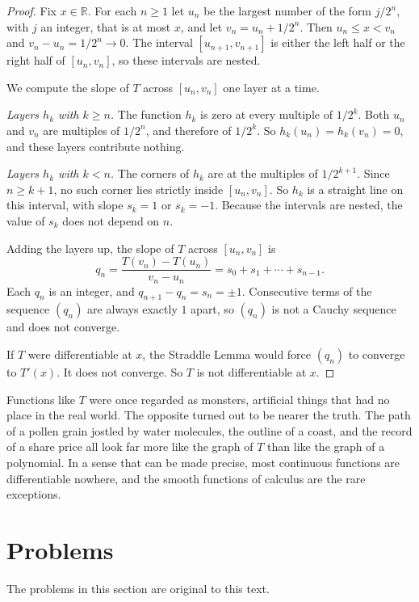 \begin{proof}
Fix $x \in \mathbb{R}$.  For each $n \geq 1$ let $u_n$ be the largest number of the form $j/2^n$, with $j$ an integer, that is at most $x$, and let $v_n = u_n + 1/2^n$.  Then $u_n \leq x < v_n$ and $v_n - u_n = 1/2^n \to 0$.  The interval $[u_{n+1}, v_{n+1}]$ is either the left half or the right half of $[u_n, v_n]$, so these intervals are nested.

We compute the slope of $T$ across $[u_n, v_n]$ one layer at a time.

\emph{Layers $h_k$ with $k \geq n$.}  The function $h_k$ is zero at every multiple of $1/2^k$.  Both $u_n$ and $v_n$ are multiples of $1/2^n$, and therefore of $1/2^k$.  So $h_k(u_n) = h_k(v_n) = 0$, and these layers contribute nothing.

\emph{Layers $h_k$ with $k < n$.}  The corners of $h_k$ are at the multiples of $1/2^{k+1}$.  Since $n \geq k + 1$, no such corner lies strictly inside $[u_n, v_n]$.  So $h_k$ is a straight line on this interval, with slope $s_k = 1$ or $s_k = -1$.  Because the intervals are nested, the value of $s_k$ does not depend on $n$.

Adding the layers up, the slope of $T$ across $[u_n, v_n]$ is
\[ q_n = \frac{T(v_n) - T(u_n)}{v_n - u_n} = s_0 + s_1 + \cdots + s_{n-1}. \]
Each $q_n$ is an integer, and $q_{n+1} - q_n = s_n = \pm 1$.  Consecutive terms of the sequence $(q_n)$ are always exactly $1$ apart, so $(q_n)$ is not a Cauchy sequence and does not converge.

If $T$ were differentiable at $x$, the Straddle Lemma would force $(q_n)$ to converge to $T'(x)$.  It does not converge.  So $T$ is not differentiable at $x$.
\end{proof}

Functions like $T$ were once regarded as monsters, artificial things that had no place in the real world.  The opposite turned out to be nearer the truth.  The path of a pollen grain jostled by water molecules, the outline of a coast, and the record of a share price all look far more like the graph of $T$ than like the graph of a polynomial.  In a sense that can be made precise, most continuous functions are differentiable nowhere, and the smooth functions of calculus are the rare exceptions.

\section{Problems}

\noindent The problems in this section are original to this text.

